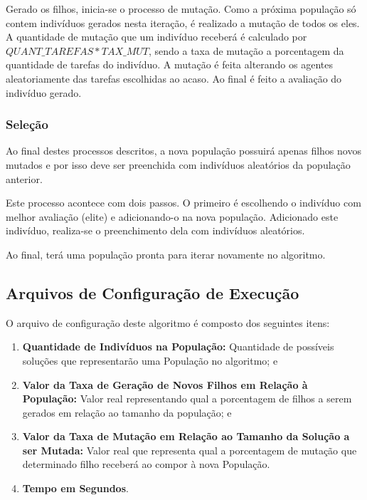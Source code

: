 \documentclass[portugues, brazil, a4paper,12pt]{article}
\begin{document}
			Gerado os filhos, inicia-se o processo de mutação. Como a próxima população só contem indivíduos gerados nesta iteração, é realizado a mutação de todos os eles. A quantidade de mutação que um indivíduo receberá é calculado por $QUANT\_TAREFAS * TAX\_MUT$, sendo a taxa de mutação a porcentagem da quantidade de tarefas do indivíduo. A mutação é feita alterando os agentes aleatoriamente das tarefas escolhidas ao acaso. Ao final é feito a avaliação do indivíduo gerado.
			

		\subsubsection{Seleção}
			Ao final destes processos descritos, a nova população possuirá apenas filhos novos mutados e por isso deve ser preenchida com indivíduos aleatórios da população anterior. 

			Este processo acontece com dois passos. O primeiro é escolhendo o indivíduo com melhor avaliação (elite) e adicionando-o na nova população. Adicionado este indivíduo, realiza-se o preenchimento dela com indivíduos aleatórios.

			Ao final, terá uma população pronta para iterar novamente no algoritmo. 
	
	
	\subsection{Arquivos de Configuração de Execução}
		O arquivo de configuração deste algoritmo é composto dos seguintes itens:
		
		\begin{enumerate}
			\item \textbf{Quantidade de Indivíduos na População:} Quantidade de possíveis soluções que representarão uma População no algoritmo; e
			
			\item \textbf{Valor da Taxa de Geração de Novos Filhos em Relação à População:} Valor real representando qual a porcentagem de filhos a serem gerados em relação ao tamanho da população; e
			
			\item \textbf{Valor da Taxa de Mutação em Relação ao Tamanho da Solução a ser Mutada:} Valor real que representa qual a porcentagem de mutação que determinado filho receberá ao compor à nova População.
			
			\item \textbf{Tempo em Segundos}.
		\end{enumerate}
		
\end{document}
